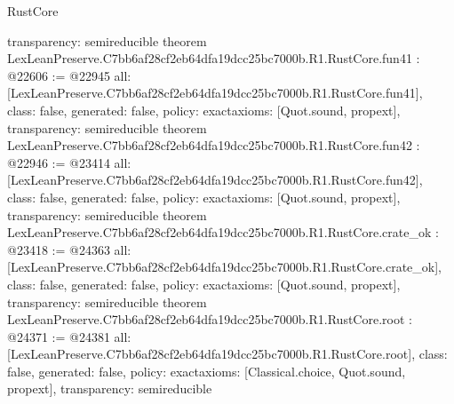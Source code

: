 \begin{lexlean}{RustCore}
\begin{coremodule}
{  transparency: semireducible
}
theorem LexLeanPreserve.C7bb6af28cf2eb64dfa19dcc25bc7000b.R1.RustCore.fun41 : @22606 := @22945 {
  all: [LexLeanPreserve.C7bb6af28cf2eb64dfa19dcc25bc7000b.R1.RustCore.fun41],
  class: false,
  generated: false,
  policy: exact{axioms: [Quot.sound, propext]},
  transparency: semireducible
}
theorem LexLeanPreserve.C7bb6af28cf2eb64dfa19dcc25bc7000b.R1.RustCore.fun42 : @22946 := @23414 {
  all: [LexLeanPreserve.C7bb6af28cf2eb64dfa19dcc25bc7000b.R1.RustCore.fun42],
  class: false,
  generated: false,
  policy: exact{axioms: [Quot.sound, propext]},
  transparency: semireducible
}
theorem LexLeanPreserve.C7bb6af28cf2eb64dfa19dcc25bc7000b.R1.RustCore.crate_ok : @23418 := @24363 {
  all: [LexLeanPreserve.C7bb6af28cf2eb64dfa19dcc25bc7000b.R1.RustCore.crate_ok],
  class: false,
  generated: false,
  policy: exact{axioms: [Quot.sound, propext]},
  transparency: semireducible
}
theorem LexLeanPreserve.C7bb6af28cf2eb64dfa19dcc25bc7000b.R1.RustCore.root : @24371 := @24381 {
  all: [LexLeanPreserve.C7bb6af28cf2eb64dfa19dcc25bc7000b.R1.RustCore.root],
  class: false,
  generated: false,
  policy: exact{axioms: [Classical.choice, Quot.sound, propext]},
  transparency: semireducible
}


\end{coremodule}
\end{lexlean}
